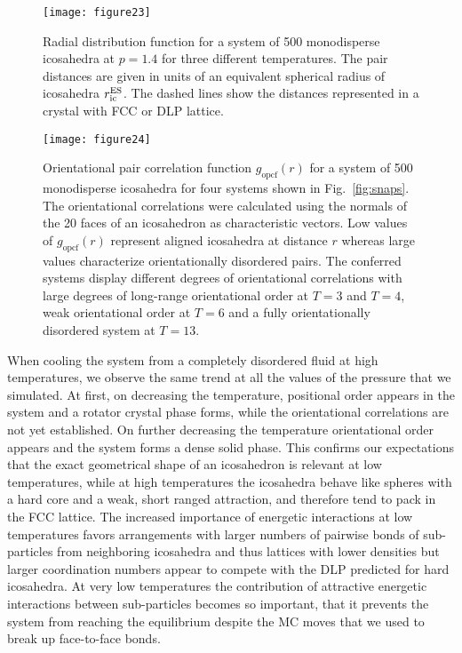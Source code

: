 \documentclass[10pt,aps,pre,twocolumn,superscriptaddress,amsmath,amssymb]{revtex4-1}
\begin{document}
\begin{figure}
  \texttt{[image: figure23]}
  \caption{Radial distribution function for a system of 500 monodisperse icosahedra  at $p=1.4$ for three different temperatures. The pair distances are given in units of an equivalent spherical radius of icosahedra $r_{\rm ic}^{\rm ES}$. The dashed lines show the distances represented in a crystal with FCC or DLP lattice.}
  \label{fig:rdf}
\end{figure}

\begin{figure}
  \texttt{[image: figure24]}
  \caption{Orientational pair correlation function $g_\text{opcf}(r)$ for a system of 500 monodisperse icosahedra for four systems shown in Fig.~\ref{fig:snaps}.
  The orientational correlations were calculated using the normals of the 20 faces of an icosahedron as characteristic vectors.
  Low values of $g_\text{opcf}(r)$ represent aligned icosahedra at distance $r$ whereas large values characterize orientationally disordered pairs.
  The conferred systems display different degrees of orientational correlations with large degrees of long-range orientational order at $T=3$ and $T=4$, weak orientational order at $T=6$ and a fully orientationally disordered system at $T=13$.}
  \label{fig:opcf}
\end{figure}

When cooling the system from a completely disordered fluid at high temperatures, we observe the same trend at all the values of the pressure that we simulated.
At first, on decreasing the temperature, positional order appears in the system and a rotator crystal phase forms, while the orientational correlations are not yet established.
On further decreasing the temperature orientational order appears and the system forms a dense solid phase.
This confirms our expectations that the exact geometrical shape of an icosahedron is relevant at low temperatures, while at high temperatures the icosahedra behave like spheres with a hard core and a weak, short ranged attraction, and therefore tend to pack in the FCC lattice.
The increased importance of energetic interactions at low temperatures favors arrangements with larger numbers of pairwise bonds of sub-particles from neighboring icosahedra and thus lattices with lower densities but larger coordination numbers appear to compete with the DLP predicted for hard icosahedra. At very low temperatures the contribution of attractive energetic interactions between sub-particles becomes so important, that it prevents the system from reaching the equilibrium despite the MC moves that we used to break up face-to-face bonds.
\end{document}
